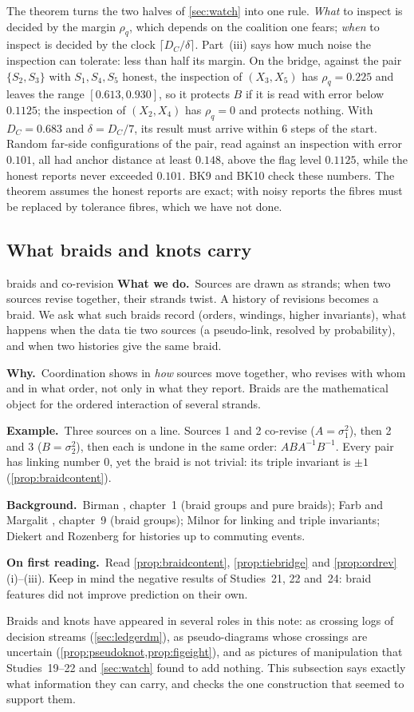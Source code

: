 \documentclass[11pt]{article}
\theoremstyle{definition}\newtheorem{definition}[theorem]{Definition}\newtheorem{remark}[theorem]{Remark}\newtheorem{example}[theorem]{Example}\newtheorem{problem}[theorem]{Open problem}\crefname{problem}{Problem}{Problems}
\newcommand{\rbwhat}{\textcolor{rbWhat}{\textbf{What we do.}}~}\newcommand{\rbwhy}{\par\smallskip\textcolor{rbWhy}{\textbf{Why.}}~}
\newcommand{\rbex}{\par\smallskip\textcolor{rbEx}{\textbf{Example.}}~}\newcommand{\rbbg}{\par\smallskip\textcolor{rbBg}{\textbf{Background.}}~}
\newcommand{\rbfirst}{\par\smallskip\textcolor{rbFirst}{\textbf{On first reading.}}~}
\begin{document}
The theorem turns the two halves of \cref{sec:watch} into one rule. \emph{What} to inspect is decided by the margin $\rho_q$, which depends on the coalition one fears; \emph{when} to inspect is decided by the clock $\lceil D_C/\delta\rceil$. Part~(iii) says how much noise the inspection can tolerate: less than half its margin. On the bridge, against the pair $\{S_2,S_3\}$ with $S_1,S_4,S_5$ honest, the inspection of $(X_3,X_5)$ has $\rho_q=0.225$ and leaves the range $[0.613,0.930]$, so it protects $B$ if it is read with error below $0.1125$; the inspection of $(X_2,X_4)$ has $\rho_q=0$ and protects nothing. With $D_C=0.683$ and $\delta=D_C/7$, its result must arrive within $6$ steps of the start. Random far-side configurations of the pair, read against an inspection with error $0.101$, all had anchor distance at least $0.148$, above the flag level $0.1125$, while the honest reports never exceeded $0.101$. BK9 and BK10 check these numbers. The theorem assumes the honest reports are exact; with noisy reports the fibres must be replaced by tolerance fibres, which we have not done.

\subsection{What braids and knots carry}\label{sec:braidknot}
\begin{readerbox}{braids and co-revision}
\rbwhat Sources are drawn as strands; when two sources revise together, their strands twist. A history of revisions becomes a braid. We ask what such braids record (orders, windings, higher invariants), what happens when the data tie two sources (a pseudo-link, resolved by probability), and when two histories give the same braid.
\rbwhy Coordination shows in \emph{how} sources move together, who revises with whom and in what order, not only in what they report. Braids are the mathematical object for the ordered interaction of several strands.
\rbex Three sources on a line. Sources 1 and 2 co-revise ($A=\sigma_1^2$), then 2 and 3 ($B=\sigma_2^2$), then each is undone in the same order: $ABA^{-1}B^{-1}$. Every pair has linking number $0$, yet the braid is not trivial: its triple invariant is $\pm1$ (\cref{prop:braidcontent}).
\rbbg Birman \cite{Birman1974}, chapter~1 (braid groups and pure braids); Farb and Margalit \cite{FarbMargalit2012}, chapter~9 (braid groups); Milnor \cite{Milnor1954} for linking and triple invariants; Diekert and Rozenberg \cite{DiekertRozenberg1995} for histories up to commuting events.
\rbfirst Read \cref{prop:braidcontent}, \cref{prop:tiebridge} and \cref{prop:ordrev}(i)--(iii). Keep in mind the negative results of Studies~21, 22 and~24: braid features did not improve prediction on their own.
\end{readerbox}
Braids and knots have appeared in several roles in this note: as crossing logs of decision streams (\cref{sec:ledgerdm}), as pseudo-diagrams whose crossings are uncertain (\cref{prop:pseudoknot,prop:figeight}), and as pictures of manipulation that Studies~19--22 and \cref{sec:watch} found to add nothing. This subsection says exactly what information they can carry, and checks the one construction that seemed to support them.
\end{document}
